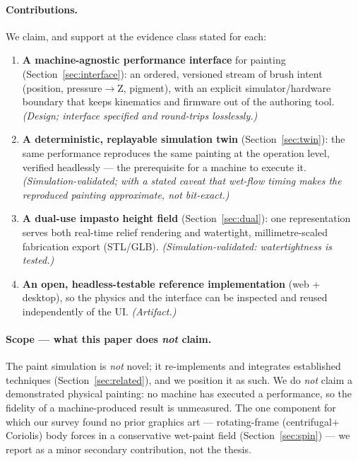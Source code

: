 \documentclass[11pt]{article}
\begin{document}
\paragraph{Contributions.} We claim, and support at the evidence class stated for
each:
\begin{enumerate}
\item \textbf{A machine-agnostic performance interface} for painting
  (Section~\ref{sec:interface}): an ordered, versioned stream of brush intent
  (position, pressure$\rightarrow$Z, pigment), with an explicit simulator/hardware
  boundary that keeps kinematics and firmware out of the authoring tool.
  \emph{(Design; interface specified and round-trips losslessly.)}
\item \textbf{A deterministic, replayable simulation twin}
  (Section~\ref{sec:twin}): the same performance reproduces the same painting at
  the operation level, verified headlessly --- the prerequisite for a machine to
  execute it. \emph{(Simulation-validated; with a stated caveat that wet-flow
  timing makes the reproduced painting approximate, not bit-exact.)}
\item \textbf{A dual-use impasto height field} (Section~\ref{sec:dual}): one
  representation serves both real-time relief rendering and watertight,
  millimetre-scaled fabrication export (STL/GLB). \emph{(Simulation-validated:
  watertightness is tested.)}
\item \textbf{An open, headless-testable reference implementation}
  (web + desktop), so the physics and the interface can be inspected and reused
  independently of the UI. \emph{(Artifact.)}
\end{enumerate}

\paragraph{Scope --- what this paper does \emph{not} claim.} The paint simulation
is \emph{not} novel; it re-implements and integrates established techniques
(Section~\ref{sec:related}), and we position it as such. We do \emph{not} claim a
demonstrated physical painting: no machine has executed a performance, so the
fidelity of a machine-produced result is unmeasured. The one component for which
our survey found no prior graphics art --- rotating-frame (centrifugal$+$Coriolis)
body forces in a conservative wet-paint field (Section~\ref{sec:spin}) --- we
report as a minor secondary contribution, not the thesis.
\end{document}
